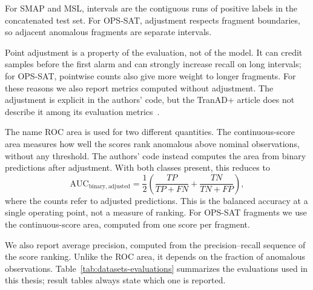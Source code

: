 For \ac{SMAP} and \ac{MSL}, intervals are the contiguous runs of positive
labels in the concatenated test set. For \ac{OPS-SAT}, adjustment respects
fragment boundaries, so adjacent anomalous fragments are separate intervals.

Point adjustment is a property of the evaluation, not of the model. It can
credit samples before the first alarm and can strongly increase recall on
long intervals; for \ac{OPS-SAT}, pointwise counts also give more weight to
longer fragments. For these reasons we also report metrics computed without
adjustment. The adjustment is explicit in the authors' code, but the TranAD+
article does not describe it among its evaluation
metrics~\cite{TranADPlusReferenceCode,Yermakov2025TranADPlus}.

The name \ac{ROC} area is used for two different quantities. The
continuous-score area measures how well the scores rank anomalous above
nominal observations, without any threshold. The authors' code instead
computes the area from binary predictions after adjustment. With both
classes present, this reduces to
\begin{equation}
  \mathrm{AUC}_{\mathrm{binary,adjusted}}
  =\frac{1}{2}\left(
      \frac{TP}{TP+FN}+\frac{TN}{TN+FP}
    \right),
  \label{eq:datasets-binary-auc}
\end{equation}
where the counts refer to adjusted predictions. This is the balanced
accuracy at a single operating point, not a measure of ranking. For
\ac{OPS-SAT} fragments we use the continuous-score area, computed from one
score per fragment.

We also report average precision, computed from the precision--recall
sequence of the score ranking. Unlike the \ac{ROC} area, it depends on the
fraction of anomalous observations. Table~\ref{tab:datasets-evaluations}
summarizes the evaluations used in this thesis; result tables always state
which one is reported.

